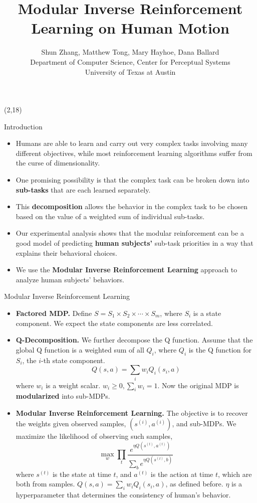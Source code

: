 \documentclass[final]{beamer}
\title{Modular Inverse Reinforcement Learning on Human Motion}
\author{Shun Zhang, Matthew Tong, Mary Hayhoe, Dana Ballard\\
Department of Computer Science, Center for Perceptual Systems\\
University of Texas at Austin}
\begin{document}
\begin{frame}{} 

\begin{textblock}{73}(2,18)
\begin{block}{Introduction}
\begin{itemize}
\item
Humans are able to learn and carry out very complex tasks involving 
many different objectives, while most reinforcement learning algorithms suffer
from the curse of dimensionality.
\item
One promising possibility is that the complex task can be broken down into 
{\bf sub-tasks} that are each learned separately.
\item
This {\bf decomposition} allows the behavior in the complex task to be chosen based on
the value of a weighted sum of individual sub-tasks.
\item
Our experimental analysis shows that the modular reinforcement can be a 
good model of predicting {\bf human subjects'} sub-task priorities in a way that
explains their behavioral choices.
\item
We use the {\bf Modular Inverse Reinforcement Learning} approach to analyze
human subjects' behaviors.
\end{itemize}
\end{block}

\begin{block}{Modular Inverse Reinforcement Learning}
\begin{itemize}
\item {\bf Factored MDP.}
Define $S = S_1 \times S_2 \times \cdots \times S_m$, where $S_i$ is a state
component. We expect the state components are less correlated.
\item {\bf Q-Decomposition.}
We further decompose the Q function.
Assume that the global Q function is a weighted sum of all $Q_i$, where $Q_i$ is
the Q function for $S_i$, the $i$-th state component.
$$Q(s, a) = \sum_i w_i Q_i (s_i, a)$$
where $w_i$ is a weight scalar. $w_i \geq 0, \sum_i w_i = 1$.
Now the original MDP is {\bf modularized} into sub-MDPs.
\item {\bf Modular Inverse Reinforcement Learning.}
The objective is to recover the weights given observed samples, $(s^{(i)},
a^{(i)})$, and sub-MDPs.  We maximize the likelihood of observing such samples,
$$\max_w \prod_t \frac{e^{\eta Q(s^{(t)}, a^{(t)})}}{\sum_b e^{\eta Q(s^{(t)},
b)}}$$
where $s^{(t)}$ is the state at time $t$, and $a^{(t)}$ is the action at time
$t$, which are both from samples. $Q(s, a) = \sum_i w_i Q_i(s_i, a)$, as defined
before. $\eta$ is a hyperparameter that determines the consistency of human's
behavior.
\end{itemize}
\end{block}
\end{textblock}


\end{frame}
\end{document}
